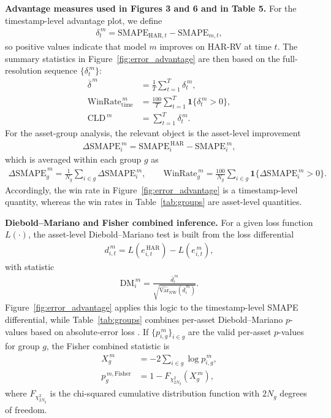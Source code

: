 ﻿\documentclass[a4paper]{article}
\begin{document}
\vspace{0.15cm}
\noindent \textbf{Advantage measures used in Figures 3 and 6 and in Table 5.}
For the timestamp-level advantage plot, we define
\begin{align*}
\delta_t^{\,m}
=
\mathrm{SMAPE}_{\mathrm{HAR},t}
-
\mathrm{SMAPE}_{m,t},
\end{align*}
so positive values indicate that model $m$ improves on HAR-RV at time $t$. The summary statistics in Figure~\ref{fig:error_advantage} are then based on the full-resolution sequence $\{\delta_t^{\,m}\}$:
\begin{align*}
\overline{\delta}^{\,m} &= \frac{1}{T}\sum_{t=1}^{T}\delta_t^{\,m},\\
\mathrm{WinRate}^{\,m}_{\mathrm{time}} &= \frac{100}{T}\sum_{t=1}^{T}\mathbf{1}\{\delta_t^{\,m}>0\},\\
\mathrm{CLD}^{\,m} &= \sum_{t=1}^{T}\delta_t^{\,m}.
\end{align*}
For the asset-group analysis, the relevant object is the asset-level improvement
\begin{align*}
\Delta \mathrm{SMAPE}^{\,m}_i
=
\mathrm{SMAPE}^{\,\mathrm{HAR}}_i
-
\mathrm{SMAPE}^{\,m}_i,
\end{align*}
which is averaged within each group $g$ as
\begin{align*}
\overline{\Delta \mathrm{SMAPE}}^{\,m}_g
=
\frac{1}{N_g}\sum_{i \in g}\Delta \mathrm{SMAPE}^{\,m}_i,
\qquad
\mathrm{WinRate}^{\,m}_g
=
\frac{100}{N_g}\sum_{i \in g}\mathbf{1}\{\Delta \mathrm{SMAPE}^{\,m}_i>0\}.
\end{align*}
Accordingly, the win rate in Figure~\ref{fig:error_advantage} is a timestamp-level quantity, whereas the win rates in Table~\ref{tab:groups} are asset-level quantities.

\vspace{0.15cm}
\noindent \textbf{Diebold--Mariano and Fisher combined inference.}
For a given loss function $L(\cdot)$, the asset-level Diebold--Mariano test is built from the loss differential
\begin{align*}
d^{\,m}_{i,t}
=
L\!\left(e^{\,\mathrm{HAR}}_{i,t}\right)
-
L\!\left(e^{\,m}_{i,t}\right),
\end{align*}
with statistic
\begin{align*}
\mathrm{DM}^{\,m}_i
=
\frac{\bar{d}^{\,m}_i}{\sqrt{\widehat{\mathrm{Var}}_{\mathrm{NW}}(\bar{d}^{\,m}_i)}}.
\end{align*}
Figure~\ref{fig:error_advantage} applies this logic to the timestamp-level SMAPE differential, while Table~\ref{tab:groups} combines per-asset Diebold--Mariano $p$-values based on absolute-error loss \cite{diebold1995}. If $\{p^{\,m}_{i,g}\}_{i \in g}$ are the valid per-asset $p$-values for group $g$, the Fisher combined statistic is
\begin{align*}
X^{\,m}_g &= -2\sum_{i \in g}\log p^{\,m}_{i,g},\\
p^{\,m,\mathrm{Fisher}}_g &= 1 - F_{\chi^2_{2N_g}}\!\left(X^{\,m}_g\right),
\end{align*}
where $F_{\chi^2_{2N_g}}$ is the chi-squared cumulative distribution function with $2N_g$ degrees of freedom.
\end{document}
